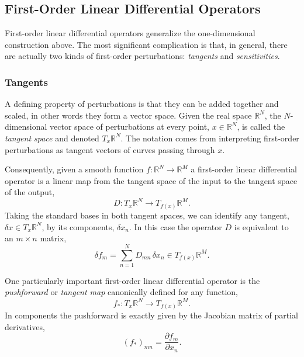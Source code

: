 \subsection{First-Order Linear Differential Operators}

First-order linear differential operators generalize the one-dimensional construction
above.  The most significant complication is that, in general, there are actually two 
kinds of first-order perturbations: \textit{tangents} and \textit{sensitivities}.

\subsubsection{Tangents}

A defining property of perturbations is that they can be added together and scaled,
in other words they form a vector space.  Given the real space $\mathbb{R}^{N}$,
the $N$-dimensional vector space of perturbations at every point, $x \in \mathbb{R}^{N}$, 
is called the \textit{tangent space} and denoted $T_{x} \mathbb{R}^{N}$.  The notation
comes from interpreting first-order perturbations as tangent vectors of curves
passing through $x$.

Consequently, given a smooth function $f : \mathbb{R}^{N} \rightarrow \mathbb{R}^{M}$
a first-order linear differential operator is a linear map from the tangent space of
the input to the tangent space of the output,
%
\begin{equation*}
D : T_{x} \mathbb{R}^{N} \rightarrow T_{ f ( x ) } \mathbb{R}^{M}.
\end{equation*}
%
Taking the standard bases in both tangent spaces, we can identify any tangent,
$\delta x \in T_{x} \mathbb{R}^{N}$, by its components, $\delta x_{n}$.  In this case
the operator $D$ is equivalent to an $m \times n$ matrix,
%
\begin{equation*}
\delta f_{m} = \sum_{n = 1}^{N} D_{mn} \, \delta x_{n} \in T_{f(x)} \mathbb{R}^{M}.
\end{equation*}

One particularly important first-order linear differential operator is the \textit{pushforward}
or \textit{tangent map} canonically defined for any function,
%
\begin{equation*}
f_{*} : T_{x} \mathbb{R}^{N} \rightarrow T_{ f ( x ) } \mathbb{R}^{M}.
\end{equation*}
%
In components the pushforward is exactly given by the Jacobian matrix of partial derivatives,
%
\begin{equation*}
\left( f_{*} \right)_{mn} = \frac{ \partial f_{m} }{ \partial x_{n} }.
\end{equation*}

